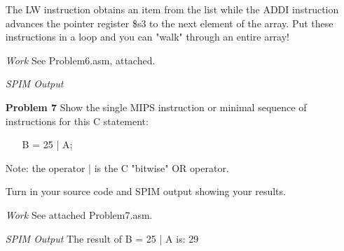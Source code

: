 \documentclass[12pt]{article}
\begin{document}
\begin{enumerate}
  \item[] The LW instruction obtains an item from the list while the ADDI instruction advances the pointer register \$s3 to the next element of the array. Put these instructions in a loop and you can "walk" through an entire array!
\end{enumerate}

\begin{enumerate}
  \item[\textit{Work}] See Problem6.asm, attached.
  \item[\textit{SPIM Output}]
\end{enumerate}






\begin{enumerate}
  \item[\textbf{Problem 7}] Show the single MIPS instruction or minimal sequence of instructions for this C statement:
  \begin{enumerate}\ttfamily
    \item[] B = 25 | A;
  \end{enumerate}

  \item[] Note: the operator | is the C "bitwise" OR operator.

  \item[] Turn in your source code and SPIM output showing your results.
\end{enumerate}

\begin{enumerate}
  \item[\textit{Work}] See attached Problem7.asm.
  \item[\textit{SPIM Output}] The result of B = 25 | A is: 29
\end{enumerate}
\end{document}
